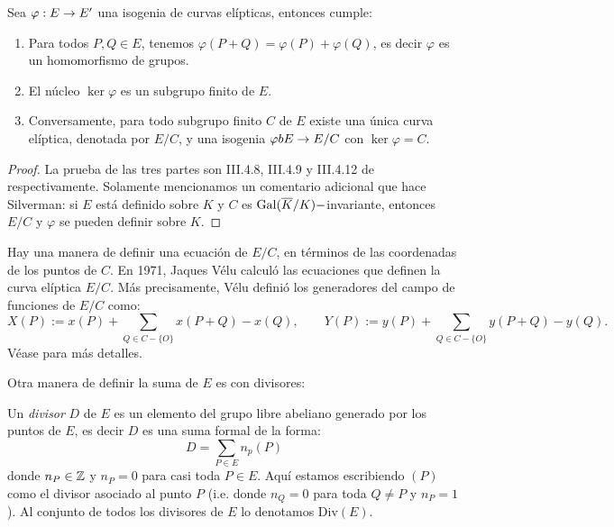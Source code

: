 \documentclass[../../tesis_maestria]{subfiles}
\begin{document}
\begin{thm}\label{thm:kernel-isogenias}
	Sea $\varphi: E\rightarrow E'$ una isogenia de curvas elípticas, entonces cumple:
	\begin{enumerate}[label=\roman*)]
		\item Para todos $P,Q\in E$, tenemos $\varphi(P+Q)=\varphi(P)+\varphi(Q)$, es decir $\varphi$ es un homomorfismo de grupos.
		\item El núcleo $\ker\varphi$ es un subgrupo finito de $E$.
		\item Conversamente, para todo subgrupo finito $C$ de $E$ existe una única curva elíptica, denotada por $E/C$, y una isogenia $\varphi bE\rightarrow E/C$ con $\ker\varphi =C$. 
	\end{enumerate}
\end{thm}
\begin{proof}
	La  prueba de las tres partes son III.4.8, III.4.9 y III.4.12 de \cite{SilvermanTAOEC} respectivamente. Solamente mencionamos un comentario adicional que hace Silverman: si $E$ está definido sobre $K$ y $C$ es $\mathrm{Gal}(\overline{K}/K)-$invariante, entonces $E/C$ y $\varphi$ se pueden definir sobre $K$.
\end{proof}

\begin{nota}
	Hay una manera de definir una ecuación de $E/C$, en términos de las coordenadas de los puntos de $C$. En 1971, Jaques Vélu calculó las ecuaciones que definen la curva elíptica $E/C$. Más precisamente, Vélu definió los generadores del campo de funciones de $E/C$ como:
	\[
		X(P):=x(P)+\sum_{Q\in C-\{O\}} x(P+Q)-x(Q),\qquad Y(P):=y(P)+\sum_{Q\in C-\{O\}} y(P+Q)-y(Q).
	\]
Véase \cite{VeluIECE} para más detalles.
\end{nota}

Otra manera de definir la suma de $E$ es con divisores:

\begin{defin}
  Un \emph{divisor} $D$ de $E$ es un elemento del grupo libre abeliano generado por los puntos de
  $E$, es decir $D$ es una suma formal de la forma:
  \[
    D=\sum_{P\in E}n_p(P)
  \]
  donde $n_P\in\mathbb{Z}$ y $n_P=0$ para casi toda $P\in E$. Aqu\'i estamos escribiendo $(P)$ como el divisor
  asociado al punto $P$ (i.e. donde $n_Q=0$ para toda $Q\neq P$ y $n_P=1$). Al conjunto de todos los
  divisores de $E$ lo denotamos Div$(E)$.
\end{defin}
\end{document}
